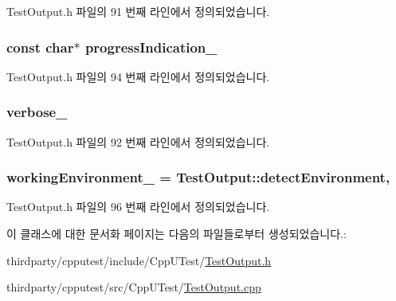 Test\+Output.\+h 파일의 91 번째 라인에서 정의되었습니다.

\subsubsection[{\texorpdfstring{progress\+Indication\+\_\+}{progressIndication_}}]{\setlength{\rightskip}{0pt plus 5cm}const char$\ast$ progress\+Indication\+\_\+\hspace{0.3cm}{\ttfamily [protected]}}\hypertarget{class_test_output_a4cbc8ea3886624399ab3879767d4f018}{}\label{class_test_output_a4cbc8ea3886624399ab3879767d4f018}


Test\+Output.\+h 파일의 94 번째 라인에서 정의되었습니다.

\subsubsection[{\texorpdfstring{verbose\+\_\+}{verbose_}}]{ verbose\+\_\+\hspace{0.3cm}{\ttfamily [protected]}}\hypertarget{class_test_output_a86126da532c138842a42d8e9a52b0806}{}\label{class_test_output_a86126da532c138842a42d8e9a52b0806}


Test\+Output.\+h 파일의 92 번째 라인에서 정의되었습니다.

\subsubsection[{\texorpdfstring{working\+Environment\+\_\+}{workingEnvironment_}}]{ working\+Environment\+\_\+ = {\bf Test\+Output\+::detect\+Environment}\hspace{0.3cm}{\ttfamily [static]}, {\ttfamily [protected]}}\hypertarget{class_test_output_a8b622cfce4b95599cd31b61a777d68ef}{}\label{class_test_output_a8b622cfce4b95599cd31b61a777d68ef}


Test\+Output.\+h 파일의 96 번째 라인에서 정의되었습니다.



이 클래스에 대한 문서화 페이지는 다음의 파일들로부터 생성되었습니다.\+:\begin{DoxyCompactItemize}
\item 
thirdparty/cpputest/include/\+Cpp\+U\+Test/\hyperlink{_test_output_8h}{Test\+Output.\+h}\item 
thirdparty/cpputest/src/\+Cpp\+U\+Test/\hyperlink{_test_output_8cpp}{Test\+Output.\+cpp}\end{DoxyCompactItemize}
